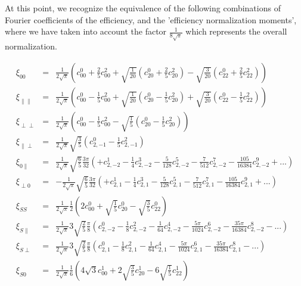 \documentclass[a4paper,10pt,twosided]{article}
\begin{document}
At this point, we recognize the equivalence of the following combinations of Fourier coefficients of the efficiency, and the 'efficiency normalization moments', where we have taken into account the factor $\frac{1}{8\sqrt{\pi}}$ which represents the overall normalization. 

\begin{eqnarray}
    \xi_{00}                 &=& \frac{1}{2\sqrt{\pi}} \left( c^0_{00}+\frac{2}{5}c^2_{00}+\sqrt{\frac{1}{20}}(c^0_{20}+\frac{2}{5}c^2_{20})-\sqrt{\frac{3}{20}}(c^0_{22}+\frac{2}{5}c^2_{22}) \right) \\
    \xi_{\parallel\parallel} &=& \frac{1}{2\sqrt{\pi}} \left( c^0_{00}-\frac{1}{5}c^2_{00}+\sqrt{\frac{1}{20}}\left(c^0_{20}-\frac{1}{5}c^2_{20}\right)+\sqrt{\frac{3}{20}}\left(c^0_{22}-\frac{1}{5}c^2_{22}\right)  \right)  \\
    \xi_{\perp\perp}         &=& \frac{1}{2\sqrt{\pi}} \left( c^0_{00}-\frac{1}{5}c^2_{00} - \sqrt{\frac{1}{5}}\left(c^0_{20}-\frac{1}{5}c^2_{20}\right)\right)\\
    \xi_{\parallel\perp}     &=& \frac{1}{2\sqrt{\pi}} \sqrt{\frac{3}{5}}\left(c^0_{2,-1}-\frac{1}{5}c^2_{2,-1}\right)  \\
    \xi_{0\parallel}         &=& \frac{1}{2\sqrt{\pi}} \sqrt{\frac{6}{5}}\frac{3\pi}{32}\left( +c^1_{2,-2}-\frac{1}{4}c^3_{2,-2}-\frac{5}{128}c^5_{2,-2}-\frac{7}{512}c^7_{2,-2} - \frac{105}{16384}c^9_{2,-2}+... \right) \\
    \xi_{\perp 0}            &=& -\frac{1}{2\sqrt{\pi}} \sqrt{\frac{6}{5}}\frac{3\pi}{32}\left( +c^1_{2,1} -\frac{1}{4}c^3_{2,1}- \frac{5}{128}c^5_{2,1} -\frac{7}{512}c^7_{2,1} - \frac{105}{16384}c^9_{2,1}+... \right) \\
    \xi_{SS}               &=&  \frac{1}{2\sqrt{\pi}}\frac{1}{2} \left(2c^0_{00} + \sqrt{\frac{1}{5}}c^0_{20} -\sqrt{\frac{3}{5}} c^0_{22}\right) \\
    \xi_{S \parallel}        &=&  \frac{1}{2\sqrt{\pi}} 3 \sqrt{\frac{2}{5}}\frac{\pi}{8} \left(c^0_{2,-2}-\frac{1}{8}c^2_{2,-2}-\frac{1}{64}c^4_{2,-2}-\frac{5\pi}{1024}c^6_{2,-2}-\frac{35\pi}{16384}c^8_{2,-2}-...\right)\\
    \xi_{S \perp}           &=& \frac{1}{2\sqrt{\pi}} 3\sqrt{\frac{2}{5}} \frac{\pi}{8} \left(c^0_{2,1}-\frac{1}{8}c^2_{2,1}-\frac{1}{64}c^4_{2,1}-\frac{5\pi}{1024}c^6_{2,1}-\frac{35\pi}{16384}c^8_{2,1}-...\right)\\
    \xi_{S 0}              &=& \frac{1}{2\sqrt{\pi}}\frac{1}{6}\left(4\sqrt{3}  c^1_{00} + 2 \sqrt{\frac{3}{5}} c^1_{20} - 6 \sqrt{\frac{1}{5}}c^1_{22}\right)
    \end{eqnarray}
\end{document}
